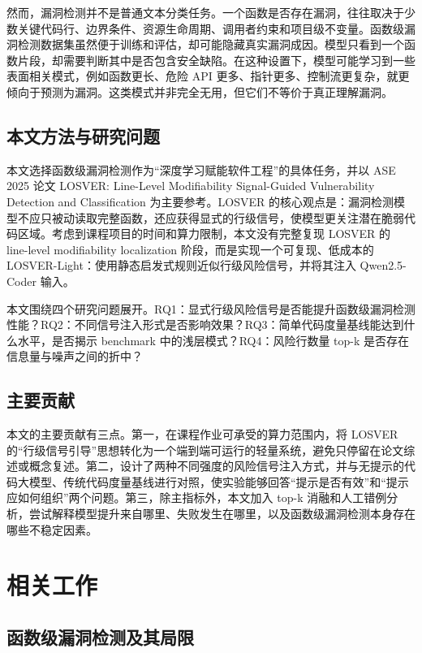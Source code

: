 \documentclass[10pt]{article}
\newcommand{\methodname}{LOSVER-Light}
\begin{document}
然而，漏洞检测并不是普通文本分类任务。一个函数是否存在漏洞，往往取决于少数关键代码行、边界条件、资源生命周期、调用者约束和项目级不变量。函数级漏洞检测数据集虽然便于训练和评估，却可能隐藏真实漏洞成因。模型只看到一个函数片段，却需要判断其中是否包含安全缺陷。在这种设置下，模型可能学习到一些表面相关模式，例如函数更长、危险 API 更多、指针更多、控制流更复杂，就更倾向于预测为漏洞。这类模式并非完全无用，但它们不等价于真正理解漏洞。

\subsection{本文方法与研究问题}

本文选择函数级漏洞检测作为“深度学习赋能软件工程”的具体任务，并以 ASE 2025 论文 LOSVER: Line-Level Modifiability Signal-Guided Vulnerability Detection and Classification 为主要参考\cite{nam2025losver}。LOSVER 的核心观点是：漏洞检测模型不应只被动读取完整函数，还应获得显式的行级信号，使模型更关注潜在脆弱代码区域。考虑到课程项目的时间和算力限制，本文没有完整复现 LOSVER 的 line-level modifiability localization 阶段，而是实现一个可复现、低成本的 \methodname{}：使用静态启发式规则近似行级风险信号，并将其注入 Qwen2.5-Coder 输入。

本文围绕四个研究问题展开。RQ1：显式行级风险信号是否能提升函数级漏洞检测性能？RQ2：不同信号注入形式是否影响效果？RQ3：简单代码度量基线能达到什么水平，是否揭示 benchmark 中的浅层模式？RQ4：风险行数量 top-k 是否存在信息量与噪声之间的折中？

\subsection{主要贡献}

本文的主要贡献有三点。第一，在课程作业可承受的算力范围内，将 LOSVER 的“行级信号引导”思想转化为一个端到端可运行的轻量系统，避免只停留在论文综述或概念复述。第二，设计了两种不同强度的风险信号注入方式，并与无提示的代码大模型、传统代码度量基线进行对照，使实验能够回答“提示是否有效”和“提示应如何组织”两个问题。第三，除主指标外，本文加入 top-k 消融和人工错例分析，尝试解释模型提升来自哪里、失败发生在哪里，以及函数级漏洞检测本身存在哪些不稳定因素。

\section{相关工作}

\subsection{函数级漏洞检测及其局限}
\end{document}
